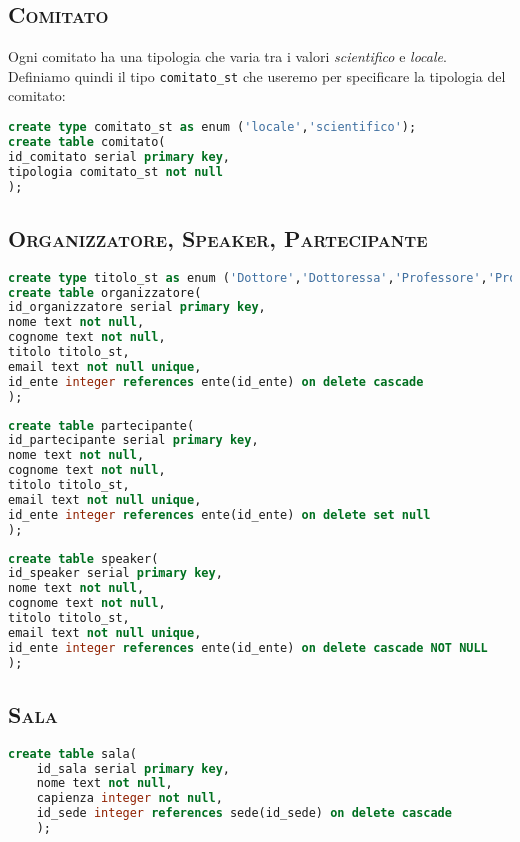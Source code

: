 \subsection{\textsc{Comitato}}
Ogni comitato ha una tipologia che varia tra i valori \textit{scientifico} e \textit{locale}. Definiamo quindi il tipo \texttt{comitato\_st} che useremo per specificare la tipologia del comitato:
\begin{lstlisting}[language=SQL,style=mystyle]
create type comitato_st as enum ('locale','scientifico');
create table comitato(
id_comitato serial primary key,
tipologia comitato_st not null
);
\end{lstlisting}
\subsection{\textsc{Organizzatore, Speaker, Partecipante}}
\begin{lstlisting}[language=SQL,style=mystyle]
create type titolo_st as enum ('Dottore','Dottoressa','Professore','Professoressa','Assistente','Ricercatore','Ricercatrice','Ingegnere');
create table organizzatore(
id_organizzatore serial primary key,
nome text not null,
cognome text not null,
titolo titolo_st,
email text not null unique,
id_ente integer references ente(id_ente) on delete cascade
);
\end{lstlisting}
\begin{lstlisting}[language=SQL,style=mystyle]
create table partecipante(
id_partecipante serial primary key,
nome text not null,
cognome text not null,
titolo titolo_st,
email text not null unique, 
id_ente integer references ente(id_ente) on delete set null
);
\end{lstlisting}
\begin{lstlisting}[language=SQL,style=mystyle]
create table speaker(
id_speaker serial primary key,
nome text not null,
cognome text not null,
titolo titolo_st,
email text not null unique,
id_ente integer references ente(id_ente) on delete cascade NOT NULL
);
\end{lstlisting}
\subsection{\textsc{Sala}}
\begin{lstlisting}[language=SQL,style=mystyle]
	create table sala(
	id_sala serial primary key,
	nome text not null,
	capienza integer not null,
	id_sede integer references sede(id_sede) on delete cascade
	);
\end{lstlisting}
